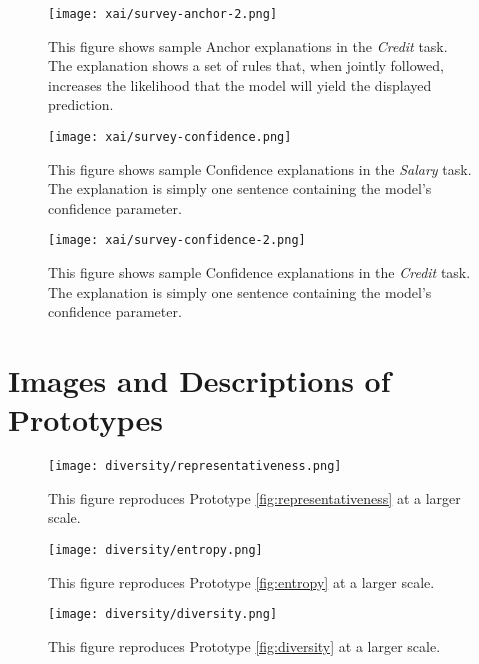 \begin{figure}[!hbtp]
    \centering
    \texttt{[image: xai/survey-anchor-2.png]}
    \caption{This figure shows sample Anchor explanations in the \emph{Credit} task. The explanation shows a set of rules that, when jointly followed, increases the likelihood that the model will yield the displayed prediction.}
    \label{fig:anchorcreditfull}
\end{figure}

\begin{figure}[!hbtp]
    \centering
    \texttt{[image: xai/survey-confidence.png]}
    \caption{This figure shows sample Confidence explanations in the \emph{Salary} task. The explanation is simply one sentence containing the model's confidence parameter.}
    \label{fig:confidencesalaryfull}
\end{figure}

\begin{figure}[!hbtp]
    \centering
    \texttt{[image: xai/survey-confidence-2.png]}
    \caption{This figure shows sample Confidence explanations in the \emph{Credit} task. The explanation is simply one sentence containing the model's confidence parameter.}
    \label{fig:confidencecreditfull}
\end{figure}

\section{Images and Descriptions of Prototypes}\label{app:divfigures}

\begin{figure}[!hbtp]
    \centering
    \texttt{[image: diversity/representativeness.png]}
    \caption{This figure reproduces Prototype \ref{fig:representativeness} at a larger scale.}
    \label{fig:representativeness_full}
\end{figure}

\begin{figure}[!hbtp]
    \centering
    \texttt{[image: diversity/entropy.png]}
    \caption{This figure reproduces Prototype \ref{fig:entropy} at a larger scale.}
    \label{fig:entropy_full}
\end{figure}

\begin{figure}[!hbtp]
    \centering
    \texttt{[image: diversity/diversity.png]}
    \caption{This figure reproduces Prototype \ref{fig:diversity} at a larger scale.}
    \label{fig:diversity_full}
\end{figure}

